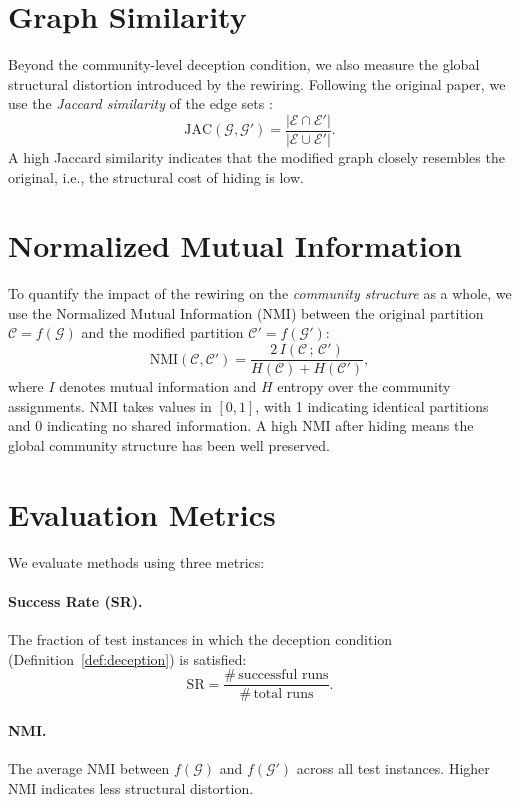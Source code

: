 \documentclass[11pt,a4paper,twoside]{tesis}
\newcommand{\G}{\mathcal{G}}
\newcommand{\E}{\mathcal{E}}
\newcommand{\C}{\mathcal{C}}
\newcommand{\Gnew}{\mathcal{G}'}
\newcommand{\SR}{\mathrm{SR}}
\newcommand{\NMI}{\mathrm{NMI}}
\begin{document}
\section{Graph Similarity}
\label{sec:similarity}

Beyond the community-level deception condition, we also measure the global structural
distortion introduced by the rewiring. Following the original paper, we use the
\emph{Jaccard similarity} of the edge sets \cite{jaccard1901jaccard}:
\[
\mathrm{JAC}(\G, \Gnew) = \frac{|\E \cap \E'|}{|\E \cup \E'|}.
\]
A high Jaccard similarity indicates that the modified graph closely resembles the
original, i.e., the structural cost of hiding is low.

\section{Normalized Mutual Information}
\label{sec:nmi}

To quantify the impact of the rewiring on the \emph{community structure} as a whole,
we use the Normalized Mutual Information (NMI) \cite{strehl2003cluster} between the
original partition $\C = f(\G)$ and the modified partition $\C' = f(\Gnew)$:
\[
\NMI(\C, \C') = \frac{2\, I(\C\,;\, \C')}{H(\C) + H(\C')},
\]
where $I$ denotes mutual information and $H$ entropy over the community assignments.
$\NMI$ takes values in $[0,1]$, with 1 indicating identical partitions and 0 indicating
no shared information. A high NMI after hiding means the global community structure has
been well preserved.

\section{Evaluation Metrics}
\label{sec:metrics}

We evaluate methods using three metrics:

\paragraph{Success Rate (SR).} The fraction of test instances in which the deception
condition (Definition~\ref{def:deception}) is satisfied:
\[
\SR = \frac{\#\,\text{successful runs}}{\#\,\text{total runs}}.
\]

\paragraph{NMI.} The average NMI between $f(\G)$ and $f(\Gnew)$ across all test
instances. Higher NMI indicates less structural distortion.
\end{document}
